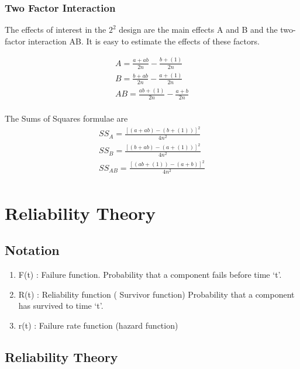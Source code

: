 \subsection{Two Factor Interaction}
The effects of interest in the $2^2$ design are the  main effects A and B and the two-factor interaction AB. It is easy to estimate the effects of these factors.

\begin{eqnarray}
A = \frac{a+ab}{2n} -  \frac{b + (1)}{2n}\\
B = \frac{b+ab}{2n} -  \frac{a + (1)}{2n}\\
AB = \frac{ab + (1)}{2n} -  \frac{a + b}{2n}\\
\end{eqnarray}

The Sums of Squares formulae are
\begin{eqnarray}
SS_{A} = \frac{[(a + ab)-(b + (1))]^2}{4n^2}\\
SS_{B} = \frac{[(b + ab)-(a + (1))]^2}{4n^2}\\
SS_{AB} = \frac{[(ab + (1))-(a + b)]^2}{4n^2}\\
\end{eqnarray}







\chapter{Reliability Theory}

\section{Notation}\begin{enumerate}
	\item
	F(t) : Failure function. Probability that a component fails
	before time `t'.
	\item R(t) : Reliability function ( Survivor function) Probability that a component
	has survived to time `t'.
	\item r(t) : Failure rate function (hazard function)
\end{enumerate}

\section{Reliability Theory}

